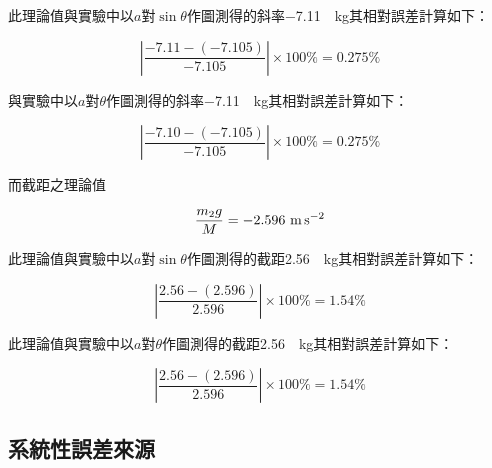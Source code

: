 \documentclass[11pt,a4paper]{article}
\theoremstyle{definition}
\begin{document}
\begin{enumerate}
                此理論值與實驗中以$a$對$\sin{\theta}$作圖測得的斜率\SI{-7.11}{\per\kilogram}其相對誤差計算如下：

                \begin{equation}
                    \left| \frac{-7.11 - (-7.105)}{-7.105} \right| \times 100\% = 0.275\%
                \end{equation}

                與實驗中以$a$對$\theta$作圖測得的斜率\SI{-7.11}{\per\kilogram}其相對誤差計算如下：

                \begin{equation}
                    \left| \frac{-7.10 - (-7.105)}{-7.105} \right| \times 100\% = 0.275\%
                \end{equation}

                而截距之理論值

                \begin{equation}
                    \- \frac{m_2g}{M} = \SI{-2.596}{\meter\per\second\squared} 
                \end{equation}

                此理論值與實驗中以$a$對$\sin\theta$作圖測得的截距\SI{2.56}{\per\kilogram}其相對誤差計算如下：

                \begin{equation}
                    \left| \frac{2.56 - (2.596)}{2.596} \right| \times 100\% = 1.54\%
                \end{equation}

                此理論值與實驗中以$a$對$\theta$作圖測得的截距\SI{2.56}{\per\kilogram}其相對誤差計算如下：

                \begin{equation}
                    \left| \frac{2.56 - (2.596)}{2.596} \right| \times 100\% = 1.54\%
                \end{equation}

            \end{enumerate}

        \subsection{系統性誤差來源}
\end{document}
